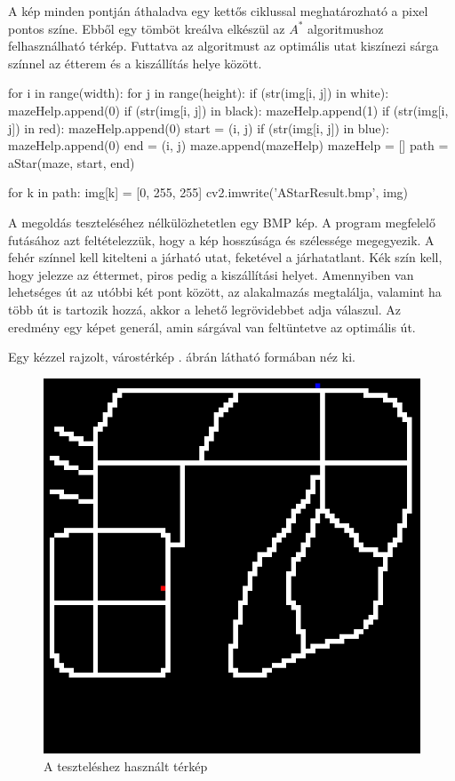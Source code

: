 A kép minden pontján áthaladva egy kettős ciklussal meghatározható a pixel pontos színe. Ebből egy tömböt kreálva elkészül az $A^{*}$ algoritmushoz felhasználható térkép. Futtatva az algoritmust az optimális utat kiszínezi sárga színnel az étterem és a kiszállítás helye között.

\begin{python}
for i in range(width):
    for j in range(height):
        if (str(img[i, j]) in white):
            mazeHelp.append(0)
        if (str(img[i, j]) in black):
            mazeHelp.append(1)
        if (str(img[i, j]) in red):
            mazeHelp.append(0)
            start = (i, j)
        if (str(img[i, j]) in blue):
            mazeHelp.append(0)
            end = (i, j)
    maze.append(mazeHelp)
    mazeHelp = []
path = aStar(maze, start, end)

for k in path:
    img[k] = [0, 255, 255]
cv2.imwrite('AStarResult.bmp', img)
\end{python}


A megoldás teszteléséhez nélkülözhetetlen egy BMP kép. A program megfelelő futásához azt feltételezzük, hogy a kép hosszúsága és szélessége megegyezik. A fehér színnel kell kitelteni a járható utat, feketével a járhatatlant. Kék szín kell, hogy jelezze az éttermet, piros pedig a kiszállítási helyet. Amennyiben van lehetséges út az utóbbi két pont között, az alakalmazás megtalálja, valamint ha több út is tartozik hozzá, akkor a lehető legrövidebbet adja válaszul. Az eredmény egy képet generál, amin sárgával van feltüntetve az optimális út.

Egy kézzel rajzolt, várostérkép . ábrán látható formában néz ki.

\begin{figure}[h!]
\centering
\includegraphics[scale=0.6]{images/AStarProblem.jpg}
\caption{A teszteléshez használt térkép}
\label{fig:model1problem}
\end{figure}

